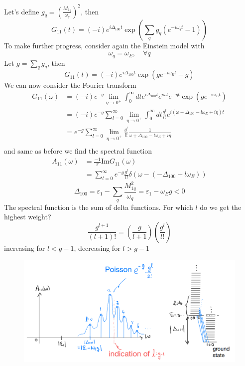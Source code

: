 Let's define $g_q=\left( \frac{M_{1q}}{\omega _q} \right) ^2$, then
\[ G_{11}\left( t \right) =\left( -i \right) e^{i\Delta _{100}t}\exp \left( \sum_q{g_q\left( e^{-i\omega _qt}-1 \right)} \right) \]
To make further progress, consider again the Einstein model with
\[ \omega _q=\omega _E,\quad \forall q\]
Let $g=\sum_q{g_q}$, then
\[ G_{11}\left( t \right) =\left( -i \right) e^{i\Delta _{100}t}\exp \left( ge^{-i\omega _Et}-g \right) \]
We can now consider the Fourier transform
\begin{align*}
    G_{11}\left( \omega \right) &=\left( -i \right) e^{-g}\lim_{\eta \rightarrow 0^+} \int_0^{\infty}{dte^{i\Delta _{100}t}e^{i\omega t}e^{-\eta t}\exp \left( ge^{-i\omega _Et} \right)}\\
    &=\left( -i \right) e^{-g}\sum_{l=0}^{\infty}{\lim_{\eta \rightarrow 0^+} \int_0^{\infty}{dt\frac{g^l}{l!}e^{i\left( \omega +\Delta _{100}-l\omega _E+i\eta \right) t}}}\\
    &=e^{-g}\sum_{l=0}^{\infty}{\lim_{\eta \rightarrow 0^+} \frac{g^l}{l!}\frac{1}{\omega +\Delta _{100}-l\omega _E+i\eta}}\\
\end{align*}
and same as before we find the spectral function
\begin{align*}
    A_{11}\left( \omega \right) &=\frac{-1}{\pi}\mathrm{Im}G_{11}\left( \omega \right) \\
    &=\sum_{l=0}^{\infty}{e^{-g}\frac{g^l}{l!}\delta \left( \omega -\left( -\Delta _{100}+l\omega _E \right) \right)}
\end{align*}
\[ \Delta _{100}=\varepsilon _1-\sum_q{\frac{M_{1q}^{2}}{\omega _q}}=\varepsilon _1-\omega _Eg<0\]
The spectral function is the sum of delta functions. For which $l$ do we get the highest weight?
\[ \frac{g^{l+1}}{\left( l+1 \right) !}=\left( \frac{g}{l+1} \right) \left( \frac{g^l}{l!} \right) \]
increasing for $l<g-1$, decreasing for $l>g-1$

\begin{figure}[ht]
    \centering
    \includegraphics[width=\textwidth]{jupyterbook/data/fig/lec07-fig00.png}
\end{figure}

